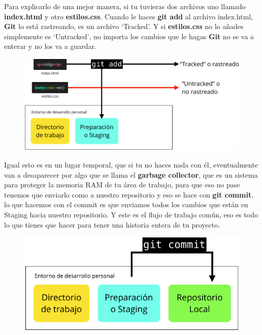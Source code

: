 \documentclass{article}
\begin{document}
Para explicarlo de una mejor manera, si tu tuvieras dos archivos uno llamado
\textbf{index.html} y otro \textbf{estilos.css}. Cuando le haces \textbf{git
add} al archivo index.html, \textbf{Git} lo está rastreando, es un archivo
`Tracked'. Y si \textbf{estilos.css} no lo añades simplemente es `Untracked',
no importa los cambios que le hagas \textbf{Git} no se va a enterar y no los va
a guardar.

\newpage

\begin{figure}[h!]
  \centering
  \includegraphics[scale=0.6]{./Pictures/120_tracked_untracked.png}
\end{figure}


Igual esto es en un lugar temporal, que si tu no haces nada con él,
eventualmente van a desaparecer por algo que se llama el \textbf{garbage
collector}, que es un sistema para proteger la memoria RAM de tu área de
trabajo, para que eso no pase tenemos que enviarlo como a nuestro repositorio y
eso se hace con \textbf{git commit}, lo que hacemos con el commit es que
enviamos todos los cambios que están en Staging hacia nuestro repositorio. Y
este es el flujo de trabajo común, eso es todo lo que tienes que hacer para
tener una historia entera de tu proyecto.

\begin{figure}[h!]
  \centering
  \includegraphics[scale=0.6]{./Pictures/121_git_commit.png}
\end{figure}
\end{document}
